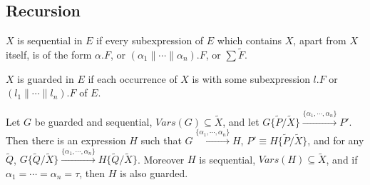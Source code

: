 \subsection{Recursion}

\begin{definition}[Sequential]
$X$ is sequential in $E$ if every subexpression of $E$ which contains $X$, apart from $X$ itself, is of the form $\alpha.F$, or $(\alpha_1\parallel\cdots\parallel\alpha_n).F$, or $\sum\widetilde{F}$.
\end{definition}

\begin{definition}
$X$ is guarded in $E$ if each occurrence of $X$ is with some subexpression $l.F$ or $(l_1\parallel\cdots\parallel l_n).F$ of $E$.
\end{definition}

\begin{lemma}\label{LUSWW}
Let $G$ be guarded and sequential, $Vars(G)\subseteq\widetilde{X}$, and let $G\{\widetilde{P}/\widetilde{X}\}\xrightarrow{\{\alpha_1,\cdots,\alpha_n\}}P'$. Then there is an expression $H$ such that $G\xrightarrow{\{\alpha_1,\cdots,\alpha_n\}}H$, $P'\equiv H\{\widetilde{P}/\widetilde{X}\}$, and for any $\widetilde{Q}$, $G\{\widetilde{Q}/\widetilde{X}\}\xrightarrow{\{\alpha_1,\cdots,\alpha_n\}} H\{\widetilde{Q}/\widetilde{X}\}$. Moreover $H$ is sequential, $Vars(H)\subseteq\widetilde{X}$, and if $\alpha_1=\cdots=\alpha_n=\tau$, then $H$ is also guarded.
\end{lemma}

